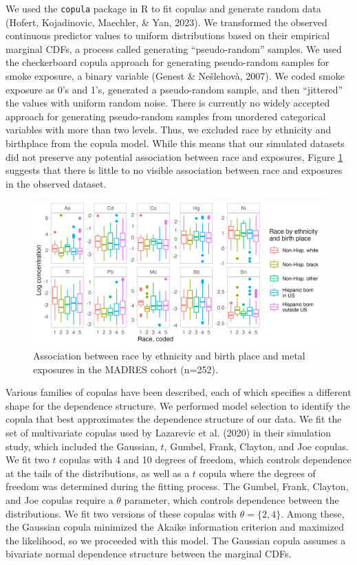 \documentclass[12pt, twoside]{amherstthesis}
\begin{document}
We used the \texttt{copula} package in R to fit copulas and generate random data (Hofert, Kojadinovic, Maechler, \& Yan, 2023). We transformed the observed continuous predictor values to uniform distributions based on their empirical marginal CDFs, a process called generating ``pseudo-random'' samples. We used the checkerboard copula approach for generating pseudo-random samples for smoke exposure, a binary variable (Genest \& Nešlehovà, 2007). We coded smoke exposure as 0's and 1's, generated a pseudo-random sample, and then ``jittered'' the values with uniform random noise. There is currently no widely accepted approach for generating pseudo-random samples from unordered categorical variables with more than two levels. Thus, we excluded race by ethnicity and birthplace from the copula model. While this means that our simulated datasets did not preserve any potential association between race and exposures, Figure \ref{fig:raceexp} suggests that there is little to no visible association between race and exposures in the observed dataset.
\begin{figure}

{\centering \includegraphics[width=0.75\linewidth]{figures/ch4_race_exp} 

}

\caption{Association between race by ethnicity and birth place and metal exposures in the MADRES cohort (n=252).}\label{fig:raceexp}
\end{figure}
Various families of copulas have been described, each of which specifies a different shape for the dependence structure. We performed model selection to identify the copula that best approximates the dependence structure of our data. We fit the set of multivariate copulas used by Lazarevic et al. (2020) in their simulation study, which included the Gaussian, \(t\), Gumbel, Frank, Clayton, and Joe copulas. We fit two \(t\) copulas with 4 and 10 degrees of freedom, which controls dependence at the tails of the distributions, as well as a \(t\) copula where the degrees of freedom was determined during the fitting process. The Gumbel, Frank, Clayton, and Joe copulas require a \(\theta\) parameter, which controls dependence between the distributions. We fit two versions of these copulas with \(\theta=\{2, 4\}\). Among these, the Gaussian copula minimized the Akaike information criterion and maximized the likelihood, so we proceeded with this model. The Gaussian copula assumes a bivariate normal dependence structure between the marginal CDFs.
\end{document}

